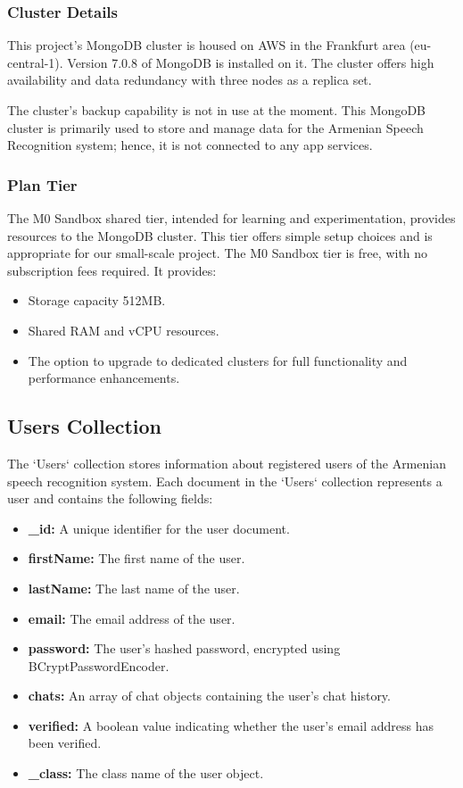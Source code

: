 \documentclass[conference]{IEEEtran}
\begin{document}
\subsubsection{Cluster Details}

This project's MongoDB cluster is housed on AWS in the Frankfurt area (eu-central-1). Version 7.0.8 of MongoDB is installed on it. The cluster offers high availability and data redundancy with three nodes as a replica set.

The cluster's backup capability is not in use at the moment. This MongoDB cluster is primarily used to store and manage data for the Armenian Speech Recognition system; hence, it is not connected to any app services.


\subsubsection{Plan Tier}

The M0 Sandbox shared tier, intended for learning and experimentation, provides resources to the MongoDB cluster. This tier offers simple setup choices and is appropriate for our small-scale project.
The M0 Sandbox tier is free, with no subscription fees required. It provides:
\begin{itemize}
    \item Storage capacity 512MB.
    \item Shared RAM and vCPU resources.
    \item The option to upgrade to dedicated clusters for full functionality and performance enhancements.
\end{itemize}

\subsection{Users Collection}

The `Users` collection stores information about registered users of the Armenian speech recognition system. Each document in the `Users` collection represents a user and contains the following fields:

\begin{itemize}
    \item \textbf{\_id:} A unique identifier for the user document.
    \item \textbf{firstName:} The first name of the user.
    \item \textbf{lastName:} The last name of the user.
    \item \textbf{email:} The email address of the user.
    \item \textbf{password:} The user's hashed password, encrypted using BCryptPasswordEncoder.
    \item \textbf{chats:} An array of chat objects containing the user's chat history.
    \item \textbf{verified:} A boolean value indicating whether the user's email address has been verified.
    \item \textbf{\_class:} The class name of the user object.
\end{itemize}
\end{document}
